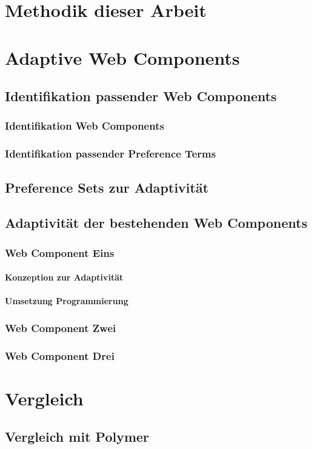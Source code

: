 \documentclass[12pt, paper=a4, bibtotoc, toc=listof]{scrreprt}
\begin{document}
	\chapter{Methodik dieser Arbeit}
	\chapter{Adaptive Web Components}
		\section{Identifikation passender Web Components}
			\subsection{Identifikation Web Components}
			\subsection{Identifikation passender Preference Terms}
		\section{Preference Sets zur Adaptivität}
		\section{Adaptivität der bestehenden Web Components}
			\subsection{Web Component Eins}
				\subsubsection{Konzeption zur Adaptivität}
				\subsubsection{Umsetzung Programmierung}
			\subsection{Web Component Zwei}
			\subsection{Web Component Drei}
	\chapter{Vergleich}
		\section{Vergleich mit Polymer}

	\printbibliography
\end{document}
